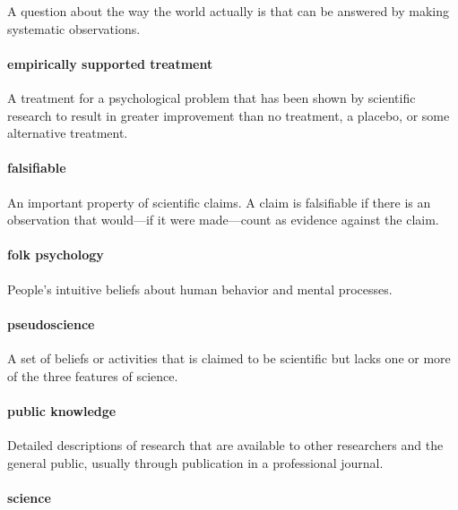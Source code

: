 \documentclass[
]{krantz}
\begin{document}
A question about the way the world actually is that can be answered by making systematic observations.

\paragraph*{empirically supported treatment}\label{empirically-supported-treatment}

A treatment for a psychological problem that has been shown by scientific research to result in greater improvement than no treatment, a placebo, or some alternative treatment.

\paragraph*{falsifiable}\label{falsifiable}

An important property of scientific claims. A claim is falsifiable if there is an observation that would---if it were made---count as evidence against the claim.

\paragraph*{folk psychology}\label{folk-psychology}

People's intuitive beliefs about human behavior and mental processes.

\paragraph*{pseudoscience}\label{pseudoscience}

A set of beliefs or activities that is claimed to be scientific but lacks one or more of the three features of science.

\paragraph*{public knowledge}\label{public-knowledge}

Detailed descriptions of research that are available to other researchers and the general public, usually through publication in a professional journal.

\paragraph*{science}\label{science}
\end{document}
